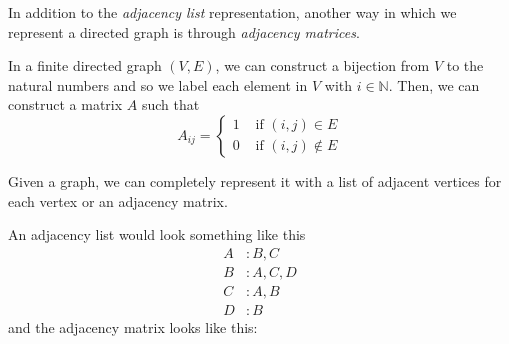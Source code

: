   In addition to the \textit{adjacency list} representation, another way in which we represent a directed graph is through \textit{adjacency matrices}. 

  \begin{definition}
    In a finite directed graph $(V, E)$, we can construct a bijection from $V$ to the natural numbers and so we label each element in $V$ with $i \in \mathbb{N}$. Then, we can construct a matrix $A$ such that 
    \begin{equation}
      A_{ij} = \begin{cases} 1 & \text{ if } (i, j) \in E \\ 0 & \text{ if } (i, j) \not\in E \end{cases}
    \end{equation}
  \end{definition}

  \begin{example}
    Given a graph, we can completely represent it with a list of adjacent vertices for each vertex or an adjacency matrix. 
    \begin{center}
    \end{center}
    An adjacency list would look something like this 
    \[
    \begin{aligned}
    A &: B, C \\
    B &: A, C, D \\
    C &: A, B \\
    D &: B
    \end{aligned}
    \]
    and the adjacency matrix looks like this: 
    \begin{center}
    \end{center}
  \end{example}

